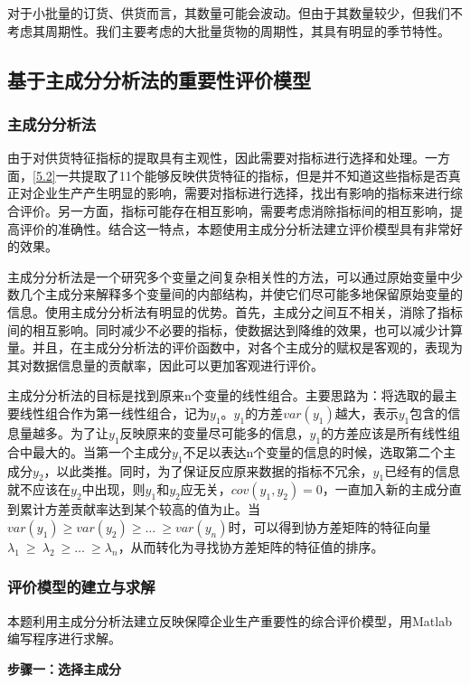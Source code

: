 \documentclass[withoutpreface,bwprint]{cumcmthesis} %
\begin{document}
对于小批量的订货、供货而言，其数量可能会波动。但由于其数量较少，但我们不考虑其周期性。我们主要考虑的大批量货物的周期性，其具有明显的季节特性。

\subsection{基于主成分分析法的重要性评价模型}

\subsubsection{主成分分析法}
由于对供货特征指标的提取具有主观性，因此需要对指标进行选择和处理。一方面，\ref{5.2}一共提取了11个能够反映供货特征的指标，但是并不知道这些指标是否真正对企业生产产生明显的影响，需要对指标进行选择，找出有影响的指标来进行综合评价。另一方面，指标可能存在相互影响，需要考虑消除指标间的相互影响，提高评价的准确性。结合这一特点，本题使用主成分分析法建立评价模型具有非常好的效果。

主成分分析法是一个研究多个变量之间复杂相关性的方法，可以通过原始变量中少数几个主成分来解释多个变量间的内部结构，并使它们尽可能多地保留原始变量的信息。使用主成分分析法有明显的优势。首先，主成分之间互不相关，消除了指标间的相互影响。同时减少不必要的指标，使数据达到降维的效果，也可以减少计算量。并且，在主成分分析法的评价函数中，对各个主成分的赋权是客观的，表现为其对数据信息量的贡献率，因此可以更加客观进行评价。

主成分分析法的目标是找到原来n个变量的线性组合。主要思路为：将选取的最主要线性组合作为第一线性组合，记为$y_1$。$y_1$的方差$var(y_1)$越大，表示$y_1$包含的信息量越多。为了让$y_1$反映原来的变量尽可能多的信息，$y_1$的方差应该是所有线性组合中最大的。当第一个主成分$y_1$不足以表达n个变量的信息的时候，选取第二个主成分$y_2$，以此类推。同时，为了保证反应原来数据的指标不冗余，$y_1$已经有的信息就不应该在$y_2$中出现，则$y_1$和$y_2$应无关，$cov(y_1,y_2)=0$，一直加入新的主成分直到累计方差贡献率达到某个较高的值为止。当$var\left(y_1\right)\geq var\left(y_2\right)\geq\ldots\ \geq var(y_n)$时，可以得到协方差矩阵的特征向量$\lambda_1\ \geq\ \lambda_2\ \geq\ldots\ \geq\lambda_n$，从而转化为寻找协方差矩阵的特征值的排序。

\subsubsection{评价模型的建立与求解}
本题利用主成分分析法建立反映保障企业生产重要性的综合评价模型，用Matlab编写程序进行求解。

\noindent\textbf{步骤一：选择主成分}
\end{document}
